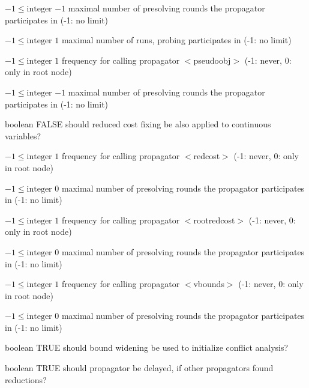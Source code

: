 %
{$-1\leq\textrm{integer}$}%
{$-1$}%
{maximal number of presolving rounds the propagator participates in (-1: no limit)}%
{}

%
{$-1\leq\textrm{integer}$}%
{$1$}%
{maximal number of runs, probing participates in (-1: no limit)}%
{}

%
{$-1\leq\textrm{integer}$}%
{$1$}%
{frequency for calling propagator $<$pseudoobj$>$ (-1: never, 0: only in root node)}%
{}

%
{$-1\leq\textrm{integer}$}%
{$-1$}%
{maximal number of presolving rounds the propagator participates in (-1: no limit)}%
{}

%
{boolean}%
{FALSE}%
{should reduced cost fixing be also applied to continuous variables?}%
{}

%
{$-1\leq\textrm{integer}$}%
{$1$}%
{frequency for calling propagator $<$redcost$>$ (-1: never, 0: only in root node)}%
{}

%
{$-1\leq\textrm{integer}$}%
{$0$}%
{maximal number of presolving rounds the propagator participates in (-1: no limit)}%
{}

%
{$-1\leq\textrm{integer}$}%
{$1$}%
{frequency for calling propagator $<$rootredcost$>$ (-1: never, 0: only in root node)}%
{}

%
{$-1\leq\textrm{integer}$}%
{$0$}%
{maximal number of presolving rounds the propagator participates in (-1: no limit)}%
{}

%
{$-1\leq\textrm{integer}$}%
{$1$}%
{frequency for calling propagator $<$vbounds$>$ (-1: never, 0: only in root node)}%
{}

%
{$-1\leq\textrm{integer}$}%
{$0$}%
{maximal number of presolving rounds the propagator participates in (-1: no limit)}%
{}

%
{boolean}%
{TRUE}%
{should bound widening be used to initialize conflict analysis?}%
{}

%
{boolean}%
{TRUE}%
{should propagator be delayed, if other propagators found reductions?}%
{}

